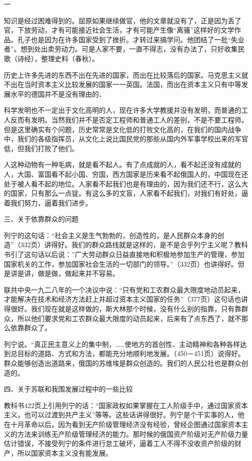 一

知识是经过困难得到的。屈原如果继续做官，他的文章就没有了，正是因为丢了官，下放劳动，才有可能接近社会生活，才有可能产生像“离骚”这样好的文学作品。孔子也是因为在许多国家受到了挫折。才转过来搞学问。他团结了一批“失业者”。想到处出卖劳动力。可是人家不要，一直不得志，没有办法了，只好收集民歌（诗经），整理史料（春秋）。

历史上许多先进的东西不出在先进的国家，而出在比较落后的国家。马克思主义就不出在当时资本主义比较发展的国家一一英国。法国，而出在资本主义只有中等发展水平的德国并不是没有理由的．

科学发明也不一定出于文化高明的人，现在许多大学教援并没有发明，而普通的工人反而有发明。当然我们并不是否定工程师和普通工人的差别，不是不要工程师。但是这里确实有个问题，历史常常是文化低的打败文化高的，在我们的国内战争中，我们的各级指挥员，从文化上说比国民党的那些从国内外军事学校出来的军官低，但我们打败了他们。

人这种动物有一种毛病，就是看不起人。有了点成就的人，看不起还没有成就的人，大国、富国看不起小国、穷国，西方国家是历来看不起俄国人的，中国现在还处于被人看不起的地位。人家看不起我们也是有理由的，因为我们还不行，这么大的国家，只有那么一点锭。有这么多的文盲，人家看不起我们，对我们有好处，逼着我们努力，逼着我们进步。

三、关于依靠群众的问题

列宁的这句话：“社会主义是生气勃勃的，创造性的，是人民群众本身的创造”（332页）讲得好。我们的群众路线就是这样的，是不是合乎列宁主义呢？教科书引了这句话以后说：”广大劳动群众日益直接地和积极地参加生产的管理，参加国家机关的工作，参加国家社会生活的一切部门的领导。”（332页）也讲得好。但是讲是讲，做是做，做起来并不容易。

联共中央一九二八年的一个决议中说：“只有党和工农群众最大限度地动员起来，才能解决在技术和经济方法赶上并超过资本主义国家的任务”（377页）这句话也讲得很好。我们现在就是这样做的，斯大林那个时候，没有什么别的指靠，只有靠群众，所以他们要求党和工农群众最大限度的动员起来，后来有了点东西了，就不那么依靠群众了。

列宁说。“真正民主意义上的集中制，……使地方的首创性、主动精神和各种各样达到总目标的道路、方式和方法，都能充分地顺利地发展。（450－451页）说得好。群众能够创造出道路来，俄国的苏维埃是群众创造的。我们的人民公社也是群众创造的。

四、关于苏联和我围发展过程中的一些比较

教科书422页上引用列宁的话：“国家政权如果掌握在工人阶级手中，通过国家资本主义，也可以过渡到共产主义”等等。这些话讲得很好。列宁是个干实事的人，他在十月革命以后，因为看到无产阶级管理经济没有经验，曾经企图通过国家资本主义的方法来训练无产阶级管理经济的能力。那时候的俄国资产阶级对无产阶级力量估计错误，不接受列宁的条件进行怠工破坏，逼着工人不得不没收资产阶级的财产，所以国家资本主义没有能发展。

